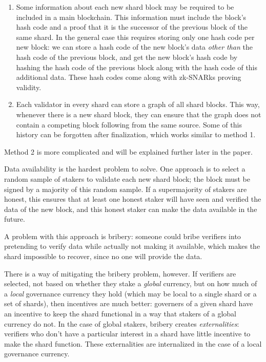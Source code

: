 \documentclass{article}
\begin{document}
\begin{enumerate}
  \item Some information about each new shard block may be required to be included in a main blockchain.  This information must include the block's hash code and a proof that it is the successor of the previous block of the same shard.  In the general case this requires storing only one hash code per new block: we can store a hash code of the new block's data \emph{other than} the hash code of the previous block, and get the new block's hash code by hashing the hash code of the previous block along with the hash code of this additional data.  These hash codes come along with zk-SNARks proving validity.
  \item Each validator in every shard can store a graph of all shard blocks.  This way, whenever there is a new shard block, they can ensure that the graph does not contain a competing block following from the same source.  Some of this history can be forgotten after finalization, which works similar to method 1.
\end{enumerate}

Method 2 is more complicated and will be explained further later in the paper.

Data availability is the hardest problem to solve.  One approach is to select a random sample of stakers to validate each new shard block; the block must be signed by a majority of this random sample.  If a supermajority of stakers are honest, this ensures that at least one honest staker will have seen and verified the data of the new block, and this honest staker can make the data available in the future.

A problem with this approach is bribery: someone could bribe verifiers into pretending to verify data while actually not making it available, which makes the shard impossible to recover, since no one will provide the data.

There is a way of mitigating the bribery problem, however.  If verifiers are selected, not based on whether they stake a \emph{global} currency, but on how much of a \emph{local} governance currency they hold (which may be local to a single shard or a set of shards), then incentives are much better: governers of a given shard have an incentive to keep the shard functional in a way that stakers of a global currency do not.  In the case of global stakers, bribery creates \emph{externalities}: verifiers who don't have a particular interest in a shard have little incentive to make the shard function.  These externalities are internalized in the case of a local governance currency.
\end{document}

